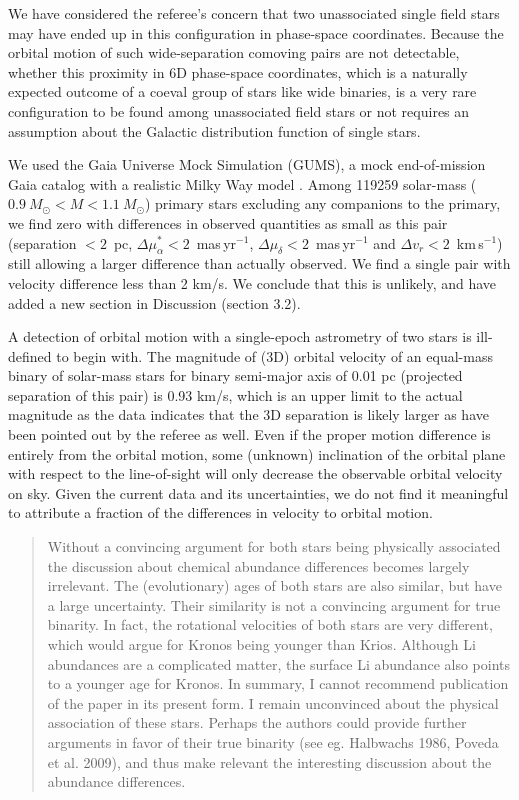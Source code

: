 \documentclass[12pt]{article}
\begin{document}
We have considered the referee's concern that two unassociated
single field stars may have ended up in this configuration in
phase-space coordinates. Because the orbital motion of such
wide-separation comoving pairs are not detectable, whether this
proximity in 6D phase-space coordinates, which is a naturally expected
outcome of a coeval group of stars like wide binaries, is a very rare
configuration to be found among unassociated field stars or not
requires an assumption about the Galactic distribution
function of single stars.

We used the Gaia Universe Mock Simulation (GUMS), a mock
end-of-mission Gaia catalog with a realistic Milky Way model \citep{gums}.
Among 119259 solar-mass ($0.9~M_\odot< M < 1.1~M_\odot$) primary stars excluding
any companions to the primary, we find zero with differences in observed
quantities as small as this pair
(separation $<2$~pc,
$\Delta \mu_\alpha^* < 2$~mas\,yr$^{-1}$,
$\Delta \mu_\delta<2$~mas\,yr$^{-1}$ and
$\Delta v_r < 2$~km\,s$^{-1}$) still
allowing a larger difference than actually observed.
We find a single pair with velocity difference less than 2 km/s.
We conclude that this is unlikely, and 
have added a new section in Discussion (section 3.2).

A detection of orbital motion with a single-epoch astrometry of two
stars is ill-defined to begin with.
The magnitude of (3D) orbital velocity of an equal-mass binary of solar-mass
stars for binary semi-major axis of 0.01 pc (projected separation of this pair)
is 0.93 km/s,
which is an upper limit to the actual magnitude as the data
indicates that the 3D separation is likely larger as have been pointed
out by the referee as well.
Even if the proper motion difference is entirely from the orbital motion, some
(unknown) inclination of the orbital plane with respect to the line-of-sight
will only decrease the observable orbital velocity on sky.
Given the current data and its uncertainties, we do not find it meaningful to
attribute a fraction of the differences in velocity to orbital motion.


\begin{quote}
Without a convincing argument for both stars being physically associated
the discussion about chemical abundance differences becomes largely
irrelevant.
The (evolutionary) ages of both stars are also similar, but have a large
uncertainty. Their similarity is not a convincing argument for true binarity.
In fact, the rotational velocities of both stars are very different,
which would argue for Kronos being younger than Krios. Although Li
abundances are a complicated matter, the surface Li abundance also
points to a younger age for Kronos. 
In summary, I cannot recommend
publication of the paper in its present form. I remain unconvinced about
the physical association of these stars. Perhaps the authors could
provide further arguments in favor of their true binarity (see eg.
Halbwachs 1986, Poveda et al. 2009), and thus make relevant the
interesting discussion about the abundance differences.
\end{quote}
\end{document}
